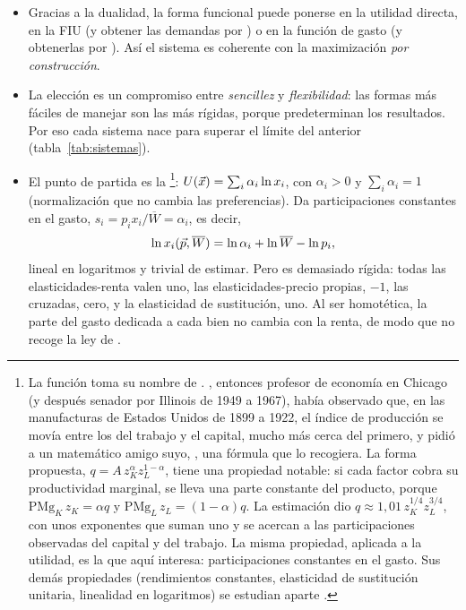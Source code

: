 \documentclass[11pt]{article}
\begin{document}
\begin{itemize}
\item Gracias a la dualidad, la forma funcional puede ponerse en la utilidad directa, en la FIU (y obtener las demandas por ) o en la función de gasto (y obtenerlas por ). Así el sistema es coherente con la maximización \emph{por construcción}.
\item La elección es un compromiso entre \emph{sencillez} y \emph{flexibilidad}: las formas más fáciles de manejar son las más rígidas, porque predeterminan los resultados. Por eso cada sistema nace para superar el límite del anterior (tabla~\ref{tab:sistemas}).
\item El punto de partida es la \footnote{La función toma su nombre de \textcite{CobbDouglas1928Theory}. , entonces profesor de economía en Chicago (y después senador por Illinois de 1949 a 1967), había observado que, en las manufacturas de Estados Unidos de 1899 a 1922, el índice de producción se movía entre los del trabajo y el capital, mucho más cerca del primero, y pidió a un matemático amigo suyo, , una fórmula que lo recogiera. La forma propuesta, $q=A\,z_K^{\alpha}z_L^{1-\alpha}$, tiene una propiedad notable: si cada factor cobra su productividad marginal, se lleva una parte constante del producto, porque $\mathrm{PMg}_K\,z_K=\alpha q$ y $\mathrm{PMg}_L\,z_L=(1-\alpha)q$. La estimación dio $q\approx1{,}01\,z_K^{1/4}z_L^{3/4}$, con unos exponentes que suman uno y se acercan a las participaciones observadas del capital y del trabajo\nocite{Douglas1976Once}. La misma propiedad, aplicada a la utilidad, es la que aquí interesa: participaciones constantes en el gasto. Sus demás propiedades (rendimientos constantes, elasticidad de sustitución unitaria, linealidad en logaritmos) se estudian aparte .}: $U(\vec{x})=\sum_i\alpha_i\ln x_i$, con $\alpha_i>0$ y $\sum_i\alpha_i=1$ (normalización que no cambia las preferencias). Da participaciones constantes en el gasto, $s_i=p_ix_i/\overline{W}=\alpha_i$, es decir,
  \begin{equation}
  \ln x_i(\vec{p},\overline{W})=\ln\alpha_i+\ln\overline{W}-\ln p_i, \label{eq:cobb-douglas}
  \end{equation}
  lineal en logaritmos y trivial de estimar. Pero es demasiado rígida: todas las elasticidades-renta valen uno, las elasticidades-precio propias, $-1$, las cruzadas, cero, y la elasticidad de sustitución, uno. Al ser homotética, la parte del gasto dedicada a cada bien no cambia con la renta, de modo que no recoge la ley de .
\end{itemize}
\end{document}
